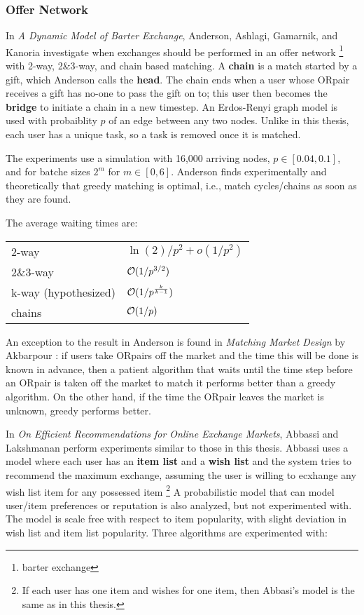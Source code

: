 \documentclass[main.tex]{subfiles}
\begin{document}
\subsubsection{Offer Network}

In \textit{A Dynamic Model of Barter Exchange}, Anderson, Ashlagi, Gamarnik, and Kanoria \cite{And1} investigate when exchanges should be performed in an offer network \footnote{barter exchange} with 2-way, 2\&3-way, and chain based matching. A \textbf{chain} is a match started by a gift, which Anderson calls the \textbf{head}. The chain ends when a user whose ORpair receives a gift has no-one to pass the gift on to; this user then becomes the \textbf{bridge} to initiate a chain in a new timestep. An Erdos-Renyi graph model \cite{Erdos} is used with probaiblity $p$ of an edge between any two nodes. Unlike in this thesis, each user has a unique task, so a task is removed once it is matched.

The experiments use a simulation with 16,000 arriving nodes, $p \in [0.04, 0.1]$, and for batche sizes $2^m$ for $m \in [0,6]$. Anderson finds experimentally and theoretically  that greedy matching is optimal, i.e., match cycles/chains as soon as they are found.

The average waiting times are:
\begin{center}
  \begin{tabular}{| l | l |}
    \hline
    2-way    & $\ln(2)/p^2 + o(1/p^2)$ \\
    2\&3-way & $\mathcal{O}(1/p^{3/2})$ \\
    k-way (hypothesized) & $\mathcal{O}(1/p^{\frac{k}{k-1}})$ \\
    chains   & $\mathcal{O}(1/p)$ \\
    \hline
  \end{tabular}
\end{center}

An exception to the result in Anderson \cite{And1} is found in \textit{Matching Market Design} by Akbarpour \cite{Akb1}: if users take ORpairs off the market and the time this will be done is known in advance, then a patient algorithm that waits until the time step before an ORpair is taken off the market to match it performs better than a greedy algorithm. On the other hand, if the time the ORpair leaves the market is unknown, greedy performs better.

In \textit{On Efficient Recommendations for Online Exchange Markets}, Abbassi and Lakshmanan \cite{Abb1} perform experiments similar to those in this thesis. Abbassi uses a model where each user has an \textbf{item list} and a \textbf{wish list} and the system tries to recommend the maximum exchange, assuming the user is willing to ecxhange any wish list item for any possessed item \footnote{If each user has one item and wishes for one item, then Abbasi's model is the same as in this thesis.} A probabilistic model that can model user/item preferences or reputation is also analyzed, but not experimented with. The model is scale free with respect to item popularity, with slight deviation in wish list and item list popularity. Three algorithms are experimented with:
\end{document}
